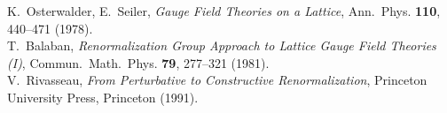 \vspace{2em}

\begin{thebibliography}{99}
	
	K.~Osterwalder, E.~Seiler,
	\textit{Gauge Field Theories on a Lattice},
	Ann.~Phys. \textbf{110}, 440--471 (1978).
	\\[-0.75em]
	
	T.~Balaban,
	\textit{Renormalization Group Approach to Lattice Gauge Field Theories (I)},
	Commun.~Math.~Phys. \textbf{79}, 277--321 (1981).
	\\[-0.75em]
	
	V.~Rivasseau,
	\textit{From Perturbative to Constructive Renormalization},
	Princeton University Press, Princeton (1991).
	
\end{thebibliography}

